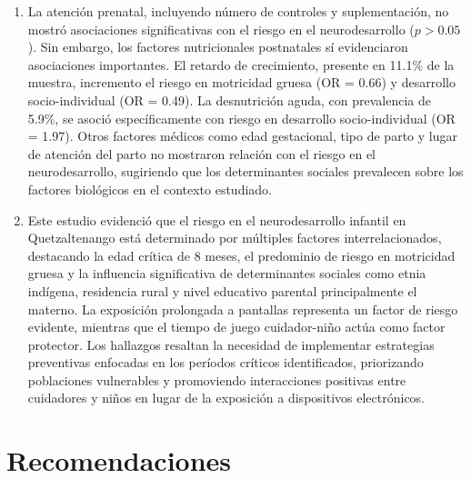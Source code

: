 \documentclass[11pt,letterpaper]{report}
\begin{document}
\begin{enumerate}
\item La atención prenatal, incluyendo número de controles y suplementación,
no mostró asociaciones significativas con el riesgo en el neurodesarrollo
($p > 0.05$). Sin embargo, los factores nutricionales postnatales sí
evidenciaron asociaciones importantes. El retardo de crecimiento, presente en
11.1\% de la muestra, incremento el riesgo en motricidad gruesa (OR = 0.66)
y desarrollo socio-individual (OR = 0.49). La desnutrición aguda, con
prevalencia de 5.9\%, se asoció específicamente con riesgo en desarrollo
socio-individual (OR = 1.97). Otros factores médicos como edad gestacional,
tipo de parto y lugar de atención del parto no mostraron relación con el
riesgo en el neurodesarrollo, sugiriendo que los determinantes sociales
prevalecen sobre los factores biológicos en el contexto estudiado.

\item Este estudio evidenció que el riesgo en el neurodesarrollo infantil en
Quetzaltenango está determinado por múltiples factores interrelacionados,
destacando la edad crítica de 8 meses, el predominio de riesgo en motricidad
gruesa y la influencia significativa de determinantes sociales como etnia
indígena, residencia rural y nivel educativo parental principalmente el materno.
La exposición prolongada a pantallas representa un factor de riesgo evidente,
mientras que el tiempo de juego cuidador-niño actúa como factor protector.
Los hallazgos resaltan la necesidad de implementar estrategias preventivas
enfocadas en los períodos críticos identificados, priorizando poblaciones
vulnerables y promoviendo interacciones positivas entre cuidadores y niños
en lugar de la exposición a dispositivos electrónicos.
\end{enumerate}

\newpage

\section{Recomendaciones}
\end{document}
